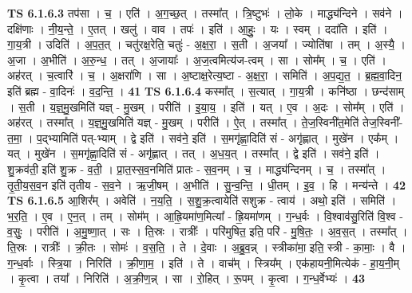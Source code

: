 \documentclass[17pt]{extarticle}
\begin{document}
                  \newline
                                \textbf{ TS 6.1.6.3} \newline
                  तप॑सा । च॒ । एति॑ । अ॒ग॒च्छ॒त् । तस्मा᳚त् । त्रि॒ष्टुभः॑ । लो॒के । माद्ध्य॑न्दिने । सव॑ने । दक्षि॑णाः । नी॒य॒न्ते॒ । ए॒तत् । खलु॑ । वाव । तपः॑ । इति॑ । आ॒हुः॒ । यः । स्वम् । ददा॑ति । इति॑ । गा॒य॒त्री । उदिति॑ । अ॒प॒त॒त् । चतु॑रक्ष॒रेति॒ चतुः॑ - अ॒क्ष॒रा॒ । स॒ती । अ॒जया᳚ । ज्योति॑षा । तम् । अ॒स्यै॒ । अ॒जा । अ॒भीति॑ । अ॒रु॒न्ध॒ । तत् । अ॒जायाः᳚ । अ॒ज॒त्वमित्य॑ज-त्वम् । सा । सोम᳚म् । च॒ । एति॑ । अह॑रत् । च॒त्वारि॑ । च॒ । अ॒क्षरा॑णि । सा । अ॒ष्टाक्ष॒रेत्य॒ष्टा - अ॒क्ष॒रा॒ । समिति॑ । अ॒प॒द्य॒त॒ । ब्र॒ह्म॒वा॒दिन॒ इति॑ ब्रह्म - वा॒दिनः॑ । व॒द॒न्ति॒ । \textbf{  41} \newline
                  \newline
                                \textbf{ TS 6.1.6.4} \newline
                  कस्मा᳚त् । स॒त्यात् । गा॒य॒त्री । कनि॑ष्ठा । छन्द॑साम् । स॒ती । य॒ज्ञ्॒मु॒खमिति॑ यज्ञ् - मु॒खम् । परीति॑ । इ॒या॒य॒ । इति॑ । यत् । ए॒व । अ॒दः । सोम᳚म् । एति॑ । अह॑रत् । तस्मा᳚त् । य॒ज्ञ्॒मु॒खमिति॑ यज्ञ् - मु॒खम् । परीति॑ । ऐ॒त् । तस्मा᳚त् । ते॒ज॒स्विनी॑त॒मेति॑ तेज॒स्विनी᳚-त॒मा॒ । प॒द्भ्यामिति॑ पत्-भ्याम् । द्वे इति॑ । सव॑ने॒ इति॑ । स॒मगृ॑ह्णा॒दिति॑ सं - अगृ॑ह्णात् । मुखे॑न । एक᳚म् । यत् । मुखे॑न । स॒मगृ॑ह्णा॒दिति॑ सं - अगृ॑ह्णात् । तत् । अ॒ध॒य॒त् । तस्मा᳚त् । द्वे इति॑ । सव॑ने॒ इति॑ । शु॒क्रव॑ती॒ इति॑ शु॒क्र - व॒ती॒ । प्रा॒त॒स्स॒व॒नमिति॑ प्रातः - स॒व॒नम् । च॒ । माद्ध्य॑न्दिनम् । च॒ । तस्मा᳚त् । तृ॒ती॒य॒स॒व॒न इति॑ तृतीय - स॒व॒ने । ऋ॒जी॒षम् । अ॒भीति॑ । सु॒न्व॒न्ति॒ । धी॒तम् । इ॒व॒ । हि । मन्य॑न्ते । \textbf{  42} \newline
                  \newline
                                \textbf{ TS 6.1.6.5} \newline
                  आ॒शिर᳚म् । अवेति॑ । न॒य॒ति॒ । स॒शु॒क्र॒त्वायेति॑ सशुक्र - त्वाय॑ । अथो॒ इति॑ । समिति॑ । भ॒र॒ति॒ । ए॒व । ए॒न॒त् । तम् । सोम᳚म् । आ॒ह्रि॒यमा॑ण॒मित्या᳚ - ह्रि॒यमा॑णम् । ग॒न्ध॒र्वः । वि॒श्वाव॑सु॒रिति॑ वि॒श्व - व॒सुः॒ । परीति॑ । अ॒मु॒ष्णा॒त् । सः । ति॒स्रः । रात्रीः᳚ । परि॑मुषित॒ इति॒ परि॑ - मु॒षि॒तः॒ । अ॒व॒स॒त् । तस्मा᳚त् । ति॒स्रः । रात्रीः᳚ । क्री॒तः । सोमः॑ । व॒स॒ति॒ । ते । दे॒वाः । अ॒ब्रु॒व॒न्न् । स्त्रीका॑मा॒ इति॒ स्त्री - का॒माः॒ । वै । ग॒न्ध॒र्वाः । स्त्रि॒या । निरिति॑ । क्री॒णा॒म॒ । इति॑ । ते । वाच᳚म् । स्त्रिय᳚म् । एक॑हायनी॒मित्येक॑ - हा॒य॒नी॒म् । कृ॒त्वा । तया᳚ । निरिति॑ । अ॒क्री॒ण॒न्न् । सा । रो॒हित् । रू॒पम् । कृ॒त्वा । ग॒न्ध॒र्वेभ्यः॑ । \textbf{  43} \newline
\end{document}
